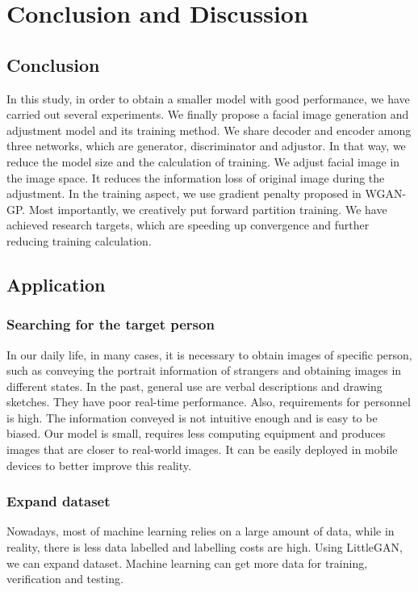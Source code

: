 \section{Conclusion and Discussion}
\subsection{Conclusion}
In this study, in order to obtain a smaller model with good performance, we have carried out several experiments.
We finally propose a facial image generation and adjustment model and its training method.
We share decoder and encoder among three networks, which are generator, discriminator and adjustor.
In that way, we reduce the model size and the calculation of training.
We adjust facial image in the image space.
It reduces the information loss of original image during the adjustment.
In the training aspect, we use gradient penalty proposed in WGAN-GP.
Most importantly, we creatively put forward partition training.
We have achieved research targets, which are speeding up convergence and further reducing training calculation.

\subsection{Application}
\subsubsection*{Searching for the target person}
In our daily life, in many cases, it is necessary to obtain images of specific person,
    such as conveying the portrait information of strangers and obtaining images in different states.
In the past, general use are verbal descriptions and drawing sketches.
They have poor real-time performance.
Also, requirements for personnel is high.
The information conveyed is not intuitive enough and is easy to be biased.
Our model is small, requires less computing equipment and produces images that are closer to real-world images.
It can be easily deployed in mobile devices to better improve this reality.

\subsubsection*{Expand dataset}
Nowadays, most of machine learning relies on a large amount of data,
    while in reality, there is less data labelled and labelling costs are high.
Using LittleGAN, we can expand dataset.
Machine learning can get more data for training,
    verification and testing.

